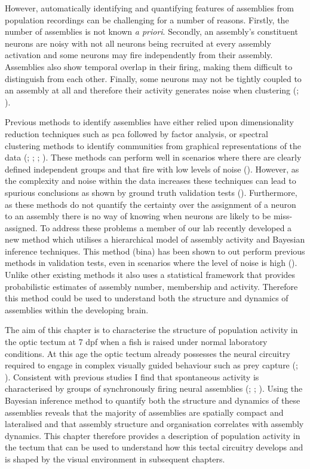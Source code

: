 However, automatically identifying and quantifying features of assemblies from population recordings can be challenging for a number of reasons. Firstly, the number of assemblies is not known \textit{a priori}. Secondly, an assembly's constituent neurons are noisy with not all neurons being recruited at every assembly activation and some neurons may fire independently from their assembly. Assemblies also show temporal overlap in their firing, making them difficult to distinguish from each other. Finally, some neurons may not be tightly coupled to an assembly at all and therefore their activity generates noise when clustering (\cite{Molter2018}; \cite{Diana2019BayesianAssemblies}).

Previous methods to identify assemblies have either relied upon dimensionality reduction techniques such as \gls{pca} followed by factor analysis, or spectral clustering methods to identify communities from graphical representations of the data (\cite{Lopes-dos-Santos2011}; \cite{Carrillo-Reid2015}; \cite{Romano2015}; \cite{Avitan2017}).  These methods can perform well in scenarios where there are clearly defined independent groups and that fire with low levels of noise (\cite{Molter2018}). However, as the complexity and noise within the data increases these techniques can lead to spurious conclusions as shown by ground truth validation tests (\cite{Diana2019BayesianAssemblies}). Furthermore, as these methods do not quantify the certainty over the assignment of a neuron to an assembly there is no way of knowing when neurons are likely to be miss-assigned.  To address these problems a member of our lab recently developed a new method which utilises a hierarchical model of assembly activity and Bayesian inference techniques. This method (\gls{bina}) has been shown to out perform previous methods in validation tests, even in scenarios where the level of noise is high (\cite{Diana2019BayesianAssemblies}). Unlike other existing methods it also uses a statistical framework that provides probabilistic estimates of assembly number, membership and activity. Therefore this method could be used to understand both the structure and dynamics of assemblies within the developing brain.

The aim of this chapter is to characterise the structure of population activity in the optic tectum at 7 \gls{dpf} when a fish is raised under normal laboratory conditions. At this age the optic tectum already possesses the neural circuitry required to engage in complex visually guided behaviour such as prey capture (\cite{Gahtan2005}; \cite{Bianco2015}). Consistent with previous studies I find that spontaneous activity is characterised by groups of synchronously firing neural assemblies (\cite{Romano2015}; \cite{Avitan2017}; \cite{Pietri2017}). Using the Bayesian inference method to quantify both the structure and dynamics of these assemblies reveals that the majority of assemblies are spatially compact and lateralised and that assembly structure and organisation correlates with assembly dynamics. This chapter therefore provides a description of population activity in the tectum that can be used to understand how this tectal circuitry develops and is shaped by the visual environment in subsequent chapters.

